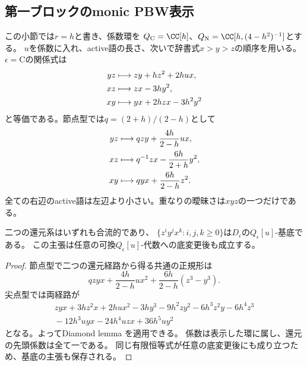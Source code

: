 \subsection{第一ブロックのmonic PBW表示}
この小節では$r=h$と書き、係数環を
$Q_{\mathrm C}=\CC[h]$、$Q_{\mathrm N}=\CC[h,(4-h^2)^{-1}]$とする。
$u$を係数に入れ、active語の長さ、次いで辞書式$x>y>z$の順序を用いる。
$\epsilon=\mathrm C$の関係式は
\begin{align}
 yz&\longmapsto zy+hz^2+2hux,\notag\\
 xz&\longmapsto zx-3hy^2,\notag\\
 xy&\longmapsto yx+2hzx-3h^2y^2
 \label{nq:eq:cusp-rewrite}
\end{align}
と等価である。節点型では$q=(2+h)/(2-h)$として
\begin{align}
 yz&\longmapsto qzy+\frac{4h}{2-h}ux,\notag\\
 xz&\longmapsto q^{-1}zx-\frac{6h}{2+h}y^2,\notag\\
 xy&\longmapsto qyx+\frac{6h}{2-h}z^2.
 \label{nq:eq:node-rewrite}
\end{align}
全ての右辺のactive語は左辺より小さい。重なりの曖昧さは$xyz$の一つだけである。
\begin{lemma}[全次数と任意の底変更に対するPBW性]
\label{nq:lem:pbw}
二つの還元系はいずれも合流的であり、
$\{z^iy^jx^k:i,j,k\ge0\}$は$D_\epsilon$の$Q_\epsilon[u]$-基底である。
この主張は任意の可換$Q_\epsilon[u]$-代数への底変更後も成立する。
\end{lemma}
\begin{proof}
節点型で二つの還元経路から得る共通の正規形は
\begin{equation}
 qzyx+\frac{4h}{2-h}ux^2+\frac{6h}{2-h}(z^3-y^3).
\end{equation}
尖点型では両経路が
\begin{equation}\begin{aligned}
 zyx+3hz^2x+2hux^2-3hy^3-9h^2zy^2-6h^3z^2y
 -6h^4z^3\\
 {}-12h^3uyx-24h^4uzx+36h^5uy^2
\end{aligned}\end{equation}
となる。よってDiamond lemma \cite[Theorem 1.2]{BergNE12}を適用できる。
係数は表示した環に属し、還元の先頭係数は全て一である。
同じ有限恒等式が任意の底変更後にも成り立つため、基底の主張も保存される。
\end{proof}

